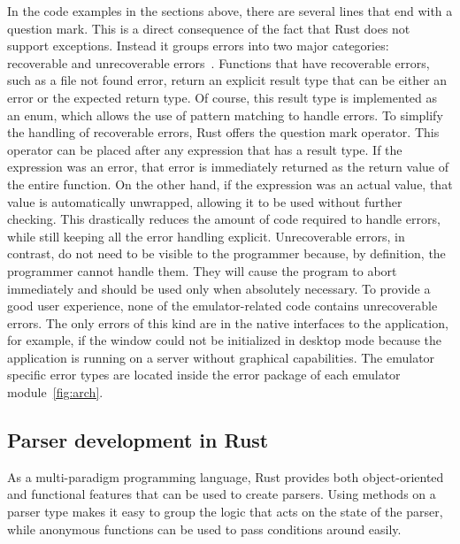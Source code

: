 In the code examples in the sections above, there are several lines that end with a question mark.
This is a direct consequence of the fact that Rust does not support exceptions.
Instead it groups errors into two major categories: recoverable and unrecoverable errors~\cite[Chapter~9]{klabnik2019rust}.
Functions that have recoverable errors, such as a file not found error, return an explicit result type that can be either an error or the expected return type.
Of course, this result type is implemented as an enum, which allows the use of pattern matching to handle errors.
To simplify the handling of recoverable errors, Rust offers the question mark operator.
This operator can be placed after any expression that has a result type.
If the expression was an error, that error is immediately returned as the return value of the entire function.
On the other hand, if the expression was an actual value, that value is automatically unwrapped, allowing it to be used without further checking.
This drastically reduces the amount of code required to handle errors, while still keeping all the error handling explicit.
Unrecoverable errors, in contrast, do not need to be visible to the programmer because, by definition, the programmer cannot handle them.
They will cause the program to abort immediately and should be used only when absolutely necessary.
To provide a good user experience, none of the emulator-related code contains unrecoverable errors.
The only errors of this kind are in the native interfaces to the application, for example, if the window could not be initialized in desktop mode because the application is running on a server without graphical capabilities.
The emulator specific error types are located inside the error package of each emulator module~\ref{fig:arch}.

\subsection{Parser development in Rust} \label{parser-dev}
As a multi-paradigm programming language, Rust provides both object-oriented and functional features that can be used to create parsers.
Using methods on a parser type makes it easy to group the logic that acts on the state of the parser, while anonymous functions can be used to pass conditions around easily.

